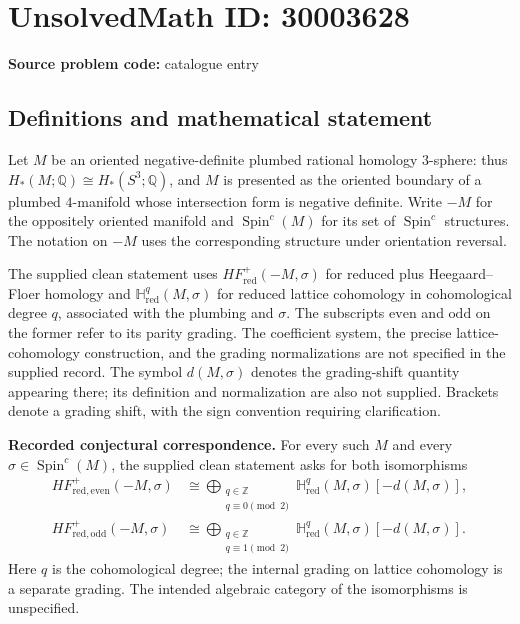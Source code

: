 \documentclass[11pt]{article}
\newcommand{\Z}{\mathbb{Z}}
\newcommand{\Q}{\mathbb{Q}}
\begin{document}
\section*{UnsolvedMath ID: 30003628}
\textbf{Source problem code:} catalogue entry
\subsection{Definitions and mathematical statement}
Let \(M\) be an oriented negative-definite plumbed rational homology \(3\)-sphere: thus \(H_*(M;\Q)\cong H_*(S^3;\Q)\), and \(M\) is presented as the oriented boundary of a plumbed \(4\)-manifold whose intersection form is negative definite. Write \(-M\) for the oppositely oriented manifold and \(\operatorname{Spin}^c(M)\) for its set of \(\operatorname{Spin}^c\) structures. The notation on \(-M\) uses the corresponding structure under orientation reversal.

The supplied clean statement uses \(HF^+_{\mathrm{red}}(-M,\sigma)\) for reduced plus Heegaard--Floer homology and \(\mathbb H^q_{\mathrm{red}}(M,\sigma)\) for reduced lattice cohomology in cohomological degree \(q\), associated with the plumbing and \(\sigma\). The subscripts \(\mathrm{even}\) and \(\mathrm{odd}\) on the former refer to its parity grading. The coefficient system, the precise lattice-cohomology construction, and the grading normalizations are not specified in the supplied record. The symbol \(d(M,\sigma)\) denotes the grading-shift quantity appearing there; its definition and normalization are also not supplied. Brackets denote a grading shift, with the sign convention requiring clarification.

\textbf{Recorded conjectural correspondence.} For every such \(M\) and every \(\sigma\in\operatorname{Spin}^c(M)\), the supplied clean statement asks for both isomorphisms
\[
\begin{aligned}
HF^+_{\mathrm{red,even}}(-M,\sigma)
&\cong
\bigoplus_{\substack{q\in\Z\\q\equiv0\pmod 2}}
\mathbb H^q_{\mathrm{red}}(M,\sigma)[-d(M,\sigma)],\\
HF^+_{\mathrm{red,odd}}(-M,\sigma)
&\cong
\bigoplus_{\substack{q\in\Z\\q\equiv1\pmod 2}}
\mathbb H^q_{\mathrm{red}}(M,\sigma)[-d(M,\sigma)].
\end{aligned}
\]
Here \(q\) is the cohomological degree; the internal grading on lattice cohomology is a separate grading. The intended algebraic category of the isomorphisms is unspecified.
\end{document}
